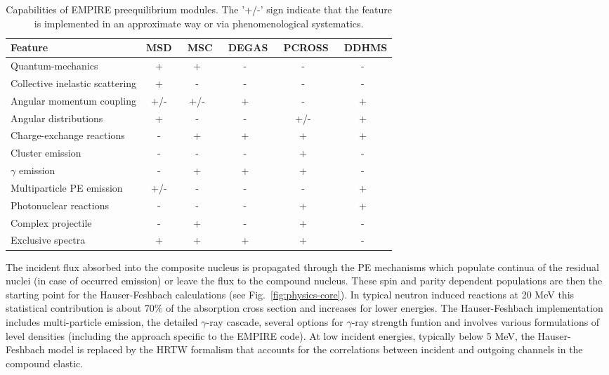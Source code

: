 \begin{table*}[tbp]
\caption{Capabilities of EMPIRE preequilibrium modules. The '+/-' sign
indicate that the feature is implemented in an approximate way or via
phenomenological systematics.}
\label{tbl:PEcapabilities}%
\begin{tabular}{lccccc}
\hline
\textbf{Feature} & \textbf{MSD } & \textbf{\ MSC } & \textbf{\ DEGAS } & 
\textbf{\ PCROSS } & \textbf{\ DDHMS } \\ \hline
Quantum-mechanics & + & + & - & - & - \\ 
Collective inelastic scattering & + & - & - & - & - \\ 
Angular momentum coupling & +/- & +/- & + & - & + \\ 
Angular distributions & + & - & - & +/- & + \\ 
Charge-exchange reactions & - & + & + & + & + \\ 
Cluster emission & - & - & - & + & - \\ 
$\gamma$ emission & - & + & + & + & - \\ 
Multiparticle PE emission & +/- & - & - & - & + \\ 
Photonuclear reactions & - & - & - & + & + \\ 
Complex projectile & - & + & - & + & - \\ 
Exclusive spectra & + & + & + & + & - \\ \hline
\end{tabular}%
\end{table*}

The incident flux absorbed into the composite nucleus is propagated through
the PE mechanisms which populate continua of the residual nuclei (in case of
occurred emission) or leave the flux to the compound nucleus. These spin and
parity dependent populations are then the starting point for the
Hauser-Feshbach calculations (see Fig.~\ref{fig:physics-core}). In typical
neutron induced reactions at 20 MeV this statistical contribution is about
70\% of the absorption cross section and increases for lower energies. The
Hauser-Feshbach implementation includes multi-particle emission, the
detailed $\gamma $-ray cascade, several options for $\gamma $-ray strength
funtion and involves various formulations of level densities (including the
approach specific to the EMPIRE code). At low incident energies, typically
below 5 MeV, the Hauser-Feshbach model is replaced by the HRTW formalism
that accounts for the correlations between incident and outgoing channels in
the compound elastic.

